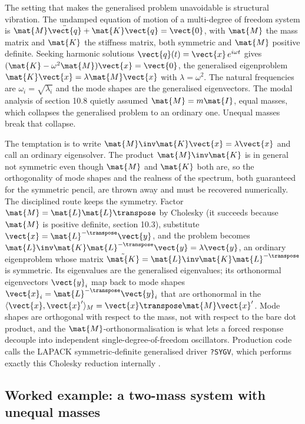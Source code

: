 The setting that makes the generalised problem unavoidable is
structural vibration. The undamped equation of motion of a multi-degree
of freedom system is $\mat{M}\ddot{\vect{q}} + \mat{K}\vect{q} =
\vect{0}$, with $\mat{M}$ the mass matrix and $\mat{K}$ the stiffness
matrix, both symmetric and $\mat{M}$ positive definite. Seeking
harmonic solutions $\vect{q}(t) = \vect{x}\,e^{i\omega t}$ gives
$(\mat{K} - \omega^{2}\mat{M})\vect{x} = \vect{0}$, the generalised
eigenproblem $\mat{K}\vect{x} = \lambda\mat{M}\vect{x}$ with
$\lambda = \omega^{2}$. The natural frequencies are
$\omega_{i} = \sqrt{\lambda_{i}}$ and the mode shapes are the
generalised eigenvectors. The modal analysis of section 10.8 quietly
assumed $\mat{M} = m\mat{I}$, equal masses, which collapses the
generalised problem to an ordinary one. Unequal masses break that
collapse.

The temptation is to write $\mat{M}\inv\mat{K}\vect{x} = \lambda\vect{x}$
and call an ordinary eigensolver. The product $\mat{M}\inv\mat{K}$ is in
general not symmetric even though $\mat{M}$ and $\mat{K}$ both are, so
the orthogonality of mode shapes and the realness of the spectrum, both
guaranteed for the symmetric pencil, are thrown away and must be
recovered numerically. The disciplined route keeps the symmetry. Factor
$\mat{M} = \mat{L}\mat{L}\transpose$ by Cholesky (it succeeds because
$\mat{M}$ is positive definite, section 10.3), substitute
$\vect{x} = \mat{L}^{-\transpose}\vect{y}$, and the problem becomes
$\mat{L}\inv\mat{K}\mat{L}^{-\transpose}\vect{y} = \lambda\vect{y}$,
an ordinary eigenproblem whose matrix $\tilde{\mat{K}} =
\mat{L}\inv\mat{K}\mat{L}^{-\transpose}$ is symmetric. Its eigenvalues
are the generalised eigenvalues; its orthonormal eigenvectors
$\vect{y}_{i}$ map back to mode shapes $\vect{x}_{i} =
\mat{L}^{-\transpose}\vect{y}_{i}$ that are orthonormal in the
 $\langle\vect{x}, \vect{x}'\rangle_{M}
= \vect{x}\transpose\mat{M}\vect{x}'$. Mode shapes are orthogonal with
respect to the mass, not with respect to the bare dot product, and the
$\mat{M}$-orthonormalisation is what lets a forced response decouple
into independent single-degree-of-freedom oscillators. Production code
calls the LAPACK symmetric-definite generalised driver \texttt{?SYGV},
which performs exactly this Cholesky reduction internally
\cite[ch.~8]{text:v2ch10-golub-vanloan2013}.

\subsection{Worked example: a two-mass system with unequal masses}

